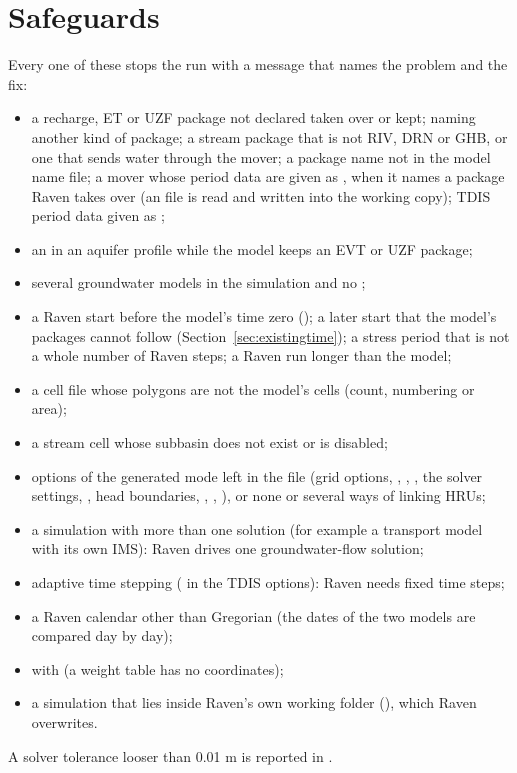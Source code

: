 \section{Safeguards}
Every one of these stops the run with a message that names the problem and the fix:
\begin{itemize}
\item a recharge, ET or UZF package not declared taken over or kept;  naming another kind of package;
      a stream package that is not RIV, DRN or GHB, or one that sends water through the mover; a package name not in the
      model name file; a mover whose period data are given as , when it names a package Raven takes over (an
       file is read and written into the working copy); TDIS period data given as ;
\item an  in an aquifer profile while the model keeps an EVT or UZF package;
\item several groundwater models in the simulation and no ;
\item a Raven start before the model's time zero (); a later start that the model's packages cannot follow (Section~\ref{sec:existingtime}); a stress period that is not a whole number of Raven steps; a Raven run longer than
      the model;
\item a cell file whose polygons are not the model's cells (count, numbering or area);
\item a stream cell whose subbasin does not exist or is disabled;
\item options of the generated mode left in the  file (grid options, , ,
      , the solver settings, , head boundaries, , ,
      ),
      or none or several ways of linking HRUs;
\item a simulation with more than one solution (for example a transport model with its own IMS): Raven drives one
      groundwater-flow solution;
\item adaptive time stepping ( in the TDIS options): Raven needs fixed time steps;
\item a Raven calendar other than Gregorian (the dates of the two models are compared day by day);
\item {} with  (a weight table has no coordinates);
\item a simulation that lies inside Raven's own working folder (), which Raven overwrites.
\end{itemize}
A solver tolerance looser than 0.01 m is reported in .

